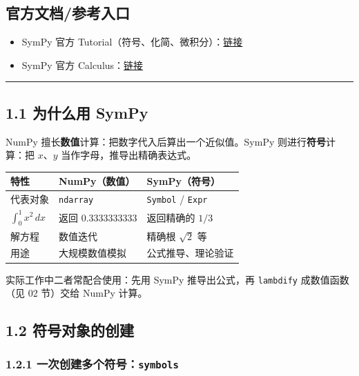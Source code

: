 \subsection{官方文档/参考入口}\label{ux5b98ux65b9ux6587ux6863ux53c2ux8003ux5165ux53e3}

\begin{itemize}
\tightlist
\item
  SymPy 官方
  Tutorial（符号、化简、微积分）：\href{https://docs.sympy.org/latest/tutorials/index.html}{链接}
\item
  SymPy 官方
  Calculus：\href{https://docs.sympy.org/latest/tutorials/intro-tutorial/calculus.html}{链接}
\end{itemize}

\begin{center}\rule{0.5\linewidth}{0.5pt}\end{center}

\subsection{1.1 为什么用 SymPy}\label{ux4e3aux4ec0ux4e48ux7528-sympy}

NumPy 擅长\textbf{数值}计算：把数字代入后算出一个近似值。SymPy
则进行\textbf{符号}计算：把 \(x\)、\(y\) 当作字母，推导出精确表达式。

{\def\LTcaptype{none} %
\begin{longtable}[]{@{}lll@{}}
\toprule\noalign{}
特性 & NumPy（数值） & SymPy（符号） \\
\midrule\noalign{}
\endhead
\bottomrule\noalign{}
\endlastfoot
代表对象 & \texttt{ndarray} & \texttt{Symbol} / \texttt{Expr} \\
\(\int_0^1 x^2\,dx\) & 返回 0.3333333333 & 返回精确的 \(1/3\) \\
解方程 & 数值迭代 & 精确根 \(\sqrt{2}\) 等 \\
用途 & 大规模数值模拟 & 公式推导、理论验证 \\
\end{longtable}
}

实际工作中二者常配合使用：先用 SymPy 推导出公式，再 \texttt{lambdify}
成数值函数（见 02 节）交给 NumPy 计算。

\subsection{1.2
符号对象的创建}\label{ux7b26ux53f7ux5bf9ux8c61ux7684ux521bux5efa}

\subsubsection{\texorpdfstring{1.2.1
一次创建多个符号：\texttt{symbols}}{1.2.1 一次创建多个符号：symbols}}\label{ux4e00ux6b21ux521bux5efaux591aux4e2aux7b26ux53f7symbols}


